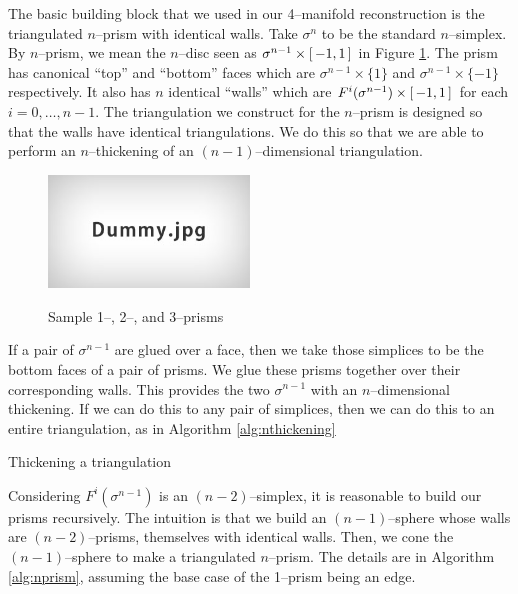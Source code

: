 The basic building block that we used in our 4--manifold reconstruction is the triangulated $n$--prism with identical walls.
Take $\sigma^n$ to be the standard $n$--simplex.
By $n$--prism, we mean the $n$--disc seen as $\sigma^{n-1}\times [\,-1,1\,]$ in Figure \ref{fig:nprism}.
The prism has canonical ``top'' and ``bottom'' faces which are $\sigma^{n-1}\times \{1\}$ and $\sigma^{n-1}\times \{-1\}$ respectively.
It also has $n$ identical ``walls'' which are $F^i(\sigma^{n-1})\times [\,-1,1\,]$ for each $i=0,\dots,n-1$.
The triangulation we construct for the $n$--prism is designed so that the walls have identical triangulations.
We do this so that we are able to perform an $n$--thickening of an $(n-1)$--dimensional triangulation.

\begin{figure}
	\centering
	\captionsetup{justification=centering}
	\caption{Sample 1--, 2--, and 3--prisms}
	\includegraphics[height=3cm]{figures/dummy.jpg}
	\label{fig:nprism}
\end{figure}

If a pair of $\sigma^{n-1}$ are glued over a face, then we take those simplices to be the bottom faces of a pair of prisms.
We glue these prisms together over their corresponding walls.
This provides the two $\sigma^{n-1}$ with an $n$--dimensional thickening.
If we can do this to any pair of simplices, then we can do this to an entire triangulation, as in Algorithm \ref{alg:nthickening}

\begin{algorithm}[h]
	\caption{Thickening a triangulation}
	\label{alg:nthickening}
\end{algorithm}

Considering $F^i(\sigma^{n-1})$ is an $(n-2)$--simplex, it is reasonable to build our prisms recursively.
The intuition is that we build an $(n-1)$--sphere whose walls are $(n-2)$--prisms, themselves with identical walls.
Then, we cone the $(n-1)$--sphere to make a triangulated $n$--prism.
The details are in Algorithm \ref{alg:nprism}, assuming the base case of the 1--prism being an edge.

